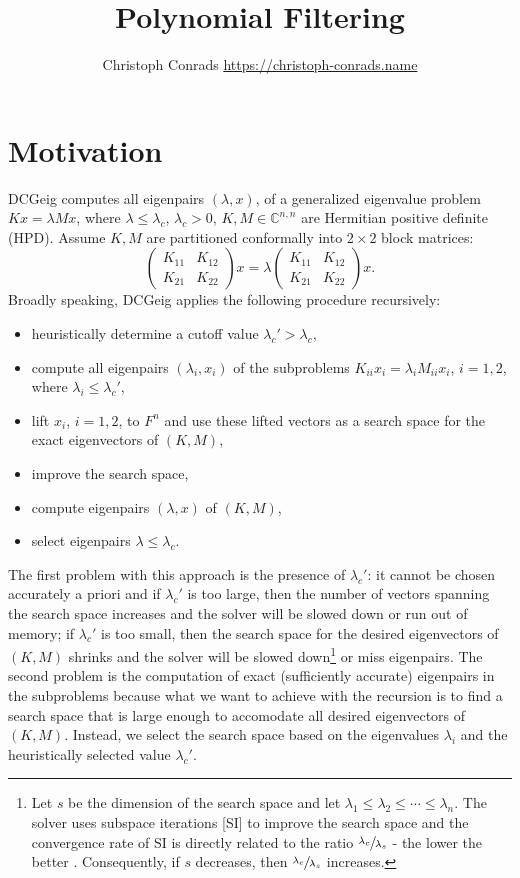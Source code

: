 \documentclass[%
	paper=a4,
	fontsize=10pt,
	DIV11,BCOR10mm,
	numbers=noenddot,
	abstract=yes
]{scrartcl}
\title{Polynomial Filtering}
\author{Christoph Conrads {\small \url{https://christoph-conrads.name}}}
\newcommand{\F}{\mathbb{C}}
\theoremstyle{definition}
\begin{document}
\maketitle



\section{Motivation}

DCGeig computes all eigenpairs $(\lambda, x)$, of a generalized eigenvalue
problem $Kx = \lambda Mx$, where $\lambda \leq \lambda_c$, $\lambda_c > 0$, $K,
M \in \F^{n,n}$ are Hermitian positive definite (HPD). Assume $K, M$ are
partitioned conformally into $2 \times 2$ block matrices:
\[
	\begin{pmatrix} K_{11} & K_{12} \\ K_{21} & K_{22} \end{pmatrix}
	x
	= \lambda \begin{pmatrix} K_{11} & K_{12} \\ K_{21} & K_{22} \end{pmatrix}x.
\]
Broadly speaking, DCGeig applies the following procedure recursively:
\begin{itemize}
	\item heuristically determine a cutoff value $\lambda_c' > \lambda_c$,
	\item compute all eigenpairs $(\lambda_i, x_i)$ of the subproblems
		$K_{ii} x_i = \lambda_i M_{ii} x_i$, $i = 1, 2$, where
		$\lambda_i \leq \lambda_c'$,
	\item lift $x_i$, $i = 1, 2$, to $F^n$ and use these lifted vectors as
		a search space for the exact eigenvectors of $(K, M)$,
	\item improve the search space,
	\item compute eigenpairs $(\lambda, x)$ of $(K, M)$,
	\item select eigenpairs $\lambda \leq \lambda_c$.
\end{itemize}
The first problem with this approach is the presence of $\lambda_c'$: it cannot
be chosen accurately a priori and if $\lambda_c'$ is too large, then the number
of vectors spanning the search space increases and the solver will be slowed
down or run out of memory; if $\lambda_c'$ is too small, then the search space
for the desired eigenvectors of $(K, M)$ shrinks and the solver will be slowed
down\footnote{Let $s$ be the dimension of the search space and let $\lambda_1
\leq \lambda_2 \leq \dotsb \leq \lambda_n$. The solver uses subspace iterations
[SI] to improve the search space and the convergence rate of SI is directly
related to the ratio $\sfrac{\lambda_c}{\lambda_s}$ - the lower the better
\cite[§5.2]{Saad2011}. Consequently, if $s$ decreases, then
$\sfrac{\lambda_c}{\lambda_s}$ increases.} or miss eigenpairs. The second
problem is the computation of exact (sufficiently accurate) eigenpairs in the
subproblems because what we want to achieve with the recursion is to find a
search space that is large enough to accomodate all desired eigenvectors of $(K,
M)$. Instead, we select the search space based on the eigenvalues $\lambda_i$
and the heuristically selected value $\lambda_c'$.
\end{document}
